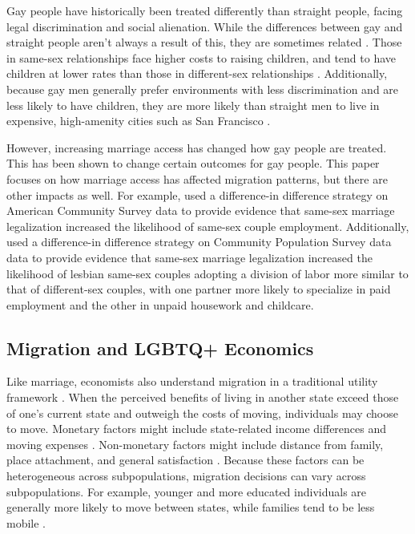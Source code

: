 \documentclass[12pt,letterpaper]{article}
\begin{document}
Gay people have historically been treated differently than straight people, facing legal discrimination and social alienation. While the differences between gay and straight people aren’t always a result of this, they are sometimes related \citep{2}. Those in same-sex relationships face higher costs to raising children, and tend to have children at lower rates than those in different-sex relationships \citep{8, 10, 11}. Additionally, because gay men generally prefer environments with less discrimination and are less likely to have children, they are more likely than straight men to live in expensive, high-amenity cities such as San Francisco \citep{7, 10, 11, 13}.

However, increasing marriage access has changed how gay people are treated. This has been shown to change certain outcomes for gay people. This paper focuses on how marriage access has affected migration patterns, but there are other impacts as well. For example, \citet{3} used a difference-in difference strategy on American Community Survey data to provide evidence that same-sex marriage legalization increased the likelihood of same-sex couple employment. Additionally, \citet{30} used a difference-in difference strategy on Community Population Survey data data to provide evidence that same-sex marriage legalization increased the likelihood of lesbian same-sex couples adopting a division of labor more similar to that of different-sex couples, with one partner more likely to specialize in paid employment and the other in unpaid housework and childcare. 

\subsection{Migration and LGBTQ+ Economics}
Like marriage, economists also understand migration in a traditional utility framework \citep{12, 8}. When the perceived benefits of living in another state exceed those of one’s current state and outweigh the costs of moving, individuals may choose to move. Monetary factors might include state-related income differences and moving expenses \citep{1, 15, 16, 17}. Non-monetary factors might include distance from family, place attachment, and general satisfaction \citep{1, 15}. Because these factors can be heterogeneous across subpopulations, migration decisions can vary across subpopulations. For example, younger and more educated individuals are generally more likely to move between states, while families tend to be less mobile \citep{16, 17}. 
\end{document}

